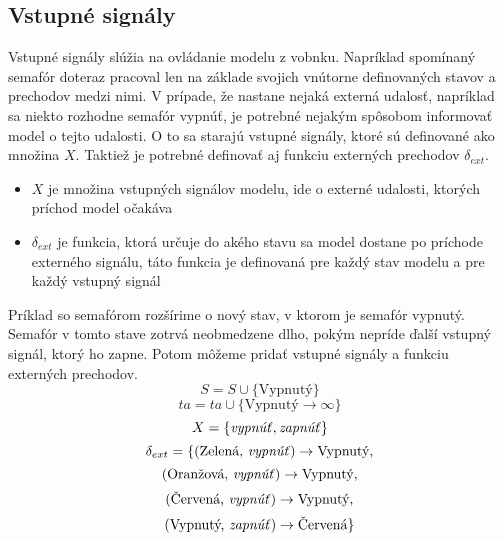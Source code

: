 \subsection*{Vstupné signály}
Vstupné signály slúžia na ovládanie modelu z vobnku.
Napríklad spomínaný semafór doteraz pracoval len na základe svojich vnútorne definovaných stavov a prechodov medzi nimi.
V prípade, že nastane nejaká externá udalosť, napríklad sa niekto rozhodne semafór vypnúť, je potrebné nejakým spôsobom informovať model o tejto udalosti.
O to sa starajú vstupné signály, ktoré sú definované ako množina $X$.
Taktiež je potrebné definovať aj funkciu externých prechodov ${\delta}_{ext}$.
\begin{itemize}
  \item $X$ je množina vstupných signálov modelu, ide o externé udalosti, ktorých príchod model očakáva
  \item ${\delta}_{ext}$ je funkcia, ktorá určuje do akého stavu sa model dostane po príchode externého signálu, táto funkcia je definovaná pre každý stav modelu a pre každý vstupný signál
\end{itemize}
Príklad so semafórom rozšírime o nový stav, v ktorom je semafór vypnutý.
Semafór v tomto stave zotrvá neobmedzene dlho, pokým nepríde ďalší vstupný signál, ktorý ho zapne.
Potom môžeme pridať vstupné signály a funkciu externých prechodov.
\[S = S \cup \{ \text{Vypnutý} \}\]
\[ta = ta \cup \{ \text{Vypnutý} \rightarrow \infty \}\]
\[X = \{\text{\textit{vypnúť}}, \text{\textit{zapnúť}} \}\]
\[\delta_{ext} = \{ (\text{Zelená, \textit{vypnúť}}) \rightarrow \text{Vypnutý},\]
\[(\text{Oranžová, \textit{vypnúť}}) \rightarrow \text{Vypnutý},\]
\[(\text{Červená, \textit{vypnúť}}) \rightarrow \text{Vypnutý},\]
\[(\text{Vypnutý, \textit{zapnúť}}) \rightarrow \text{Červená} \}\]  

